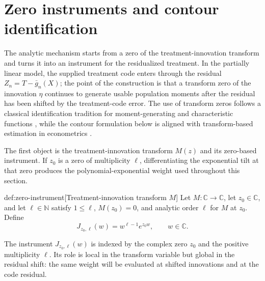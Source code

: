 \section{Zero instruments and contour identification}

The analytic mechanism starts from a zero of the treatment-innovation transform and turns it into an instrument for the residualized treatment. In the partially linear model, the supplied treatment code enters through the residual \(Z_n=T-\bar g_n(X)\); the point of the construction is that a transform zero of the innovation \(\eta\) continues to generate usable population moments after the residual has been shifted by the treatment-code error. The use of transform zeros follows a classical identification tradition for moment-generating and characteristic functions \citep{KaganLinnikRao1973,Mattner1992,DHaultfoeuille2011,DarollesFanFlorensRenault2011,HuShiu2022}, while the contour formulation below is aligned with transform-based estimation in econometrics \citep{FeuervergerMcDunnough1981,Singleton2001,CarrascoFlorensRenault2007,Carrasco2017}.

The first object is the treatment-innovation transform \(M(z)\) and its zero-based instrument. If \(z_0\) is a zero of multiplicity \(\ell\), differentiating the exponential tilt at that zero produces the polynomial-exponential weight used throughout this section.

\begin{definitionv}{def:zero-instrument}[Treatment-innovation transform \(M\)]
Let \(M:\mathbb C\to\mathbb C\), let \(z_0\in\mathbb C\), and let \(\ell\in\mathbb N\) satisfy \(1\le \ell\), \(M(z_0)=0\), and analytic order \(\ell\) for \(M\) at \(z_0\). Define
\[
J_{z_0,\ell}(w)=w^{\ell-1}e^{z_0w},\qquad w\in\mathbb C.
\]
\end{definitionv}

The instrument \(J_{z_0,\ell}(w)\) is indexed by the complex zero \(z_0\) and the positive multiplicity \(\ell\). Its role is local in the transform variable but global in the residual shift: the same weight will be evaluated at shifted innovations and at the code residual.

